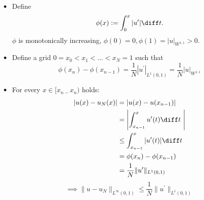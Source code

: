 \begin{example}
\begin{enumerate}[label = \Roman*)]
			\begin{itemize}
				\item Define
					\begin{equation*}
						\phi(x) := \int_{0}^x |u^\prime | \diff t.
					\end{equation*}
					$\phi$ is monotonically increasing, $\phi(0)=0,\phi(1)=|u|_{W^{1,1}} > 0$.
				\item Define a grid $0 = x_{0} < x_{1}< \dots < x_{N} = 1$ such that
					\begin{equation*}
						\phi(x_{n}) - \phi(x_{n-1}) = \frac{1}{N} |u^\prime|_{L^1(0,1)}= \frac{1}{N} |u|_{W^{1,1}}
					\end{equation*}
				\item For every $x \in [x_{n-}x_{n})$ holds:
					\begin{align*}
						|u(x)-u_{N}(x)|&= |u(x)-u(x_{n-1})|\\
									   &= \left| \int_{x_{n-1}}^{x} u^\prime(t) \diff t\ \right|\\
									   &\leq \int_{x_{n-1}}^{x} |u^\prime(t)| \diff t\\\
									   &= \phi(x_{n}) - \phi(x_{n-1}) \\
									   &= \frac{1}{N} \|u^\prime\|_{L^{1}(0,1)}						  
					\end{align*}
					\begin{equation*}
						\implies \|u - u_{N}\|_{L^{\infty}(0,1)} \leq \frac{1}{N} \|u^\prime\|_{L^{1}(0,1)}
					\end{equation*}
			\end{itemize}
	\end{enumerate}
\end{example}
